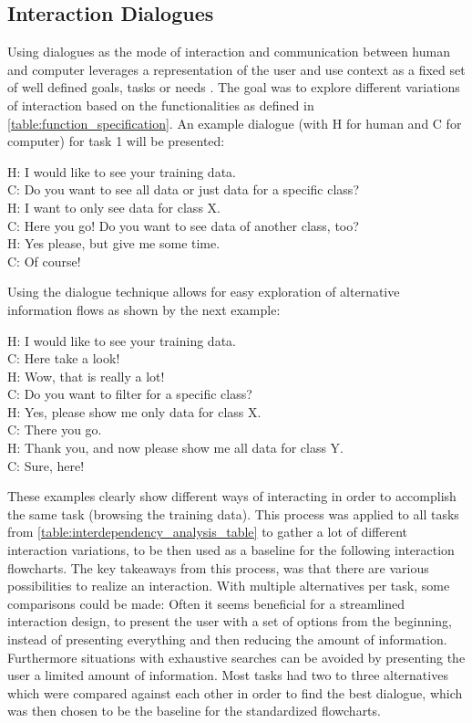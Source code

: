 \documentclass[11pt,a4paper,english]{scrreprt}
\begin{document}
\subsection{Interaction Dialogues}\label{subsection:interaction_dialogues}
Using dialogues as the mode of interaction and communication between human and computer leverages a representation of the user and use context as a fixed set of well defined goals, tasks or needs \parencite[p.4]{wright_user_2005}. The goal was to explore different variations of interaction based on the functionalities as defined in \autoref{table:function_specification}. An example dialogue (with H for human and C for computer) for task 1 will be presented:
\begin{displayquote}
    H: I would like to see your training data.\\
    C: Do you want to see all data or just data for a specific class?\\
    H: I want to only see data for class X.\\
    C: Here you go! Do you want to see data of another class, too?\\
    H: Yes please, but give me some time.\\
    C: Of course!
\end{displayquote}

Using the dialogue technique allows for easy exploration of alternative information flows as shown by the next example:
\begin{displayquote}
    H: I would like to see your training data.\\
    C: Here take a look!\\
    H: Wow, that is really a lot!\\
    C: Do you want to filter for a specific class?\\
    H: Yes, please show me only data for class X.\\
    C: There you go.\\
    H: Thank you, and now please show me all data for class Y.\\
    C: Sure, here!
\end{displayquote}

These examples clearly show different ways of interacting in order to accomplish the same task (browsing the training data). This process was applied to all tasks from \autoref{table:interdependency_analysis_table} to gather a lot of different interaction variations, to be then used as a baseline for the following interaction flowcharts. The key takeaways from this process, was that there are various possibilities to realize an interaction. With multiple alternatives per task, some comparisons could be made: Often it seems beneficial for a streamlined interaction design, to present the user with a set of options from the beginning, instead of presenting everything and then reducing the amount of information. Furthermore situations with exhaustive searches can be avoided by presenting the user a limited amount of information. Most tasks had two to three alternatives which were compared against each other in order to find the best dialogue, which was then chosen to be the baseline for the standardized flowcharts.
\end{document}
